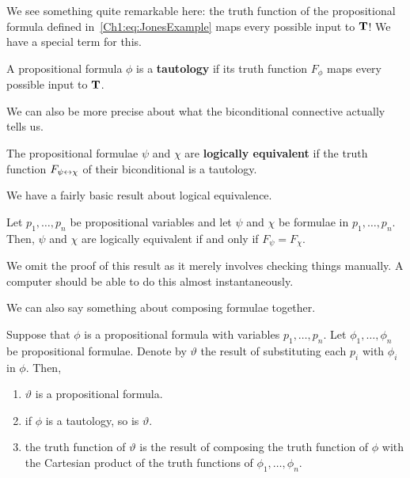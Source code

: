 \begin{boxexample}
    \sorry %
\end{boxexample}

We see something quite remarkable here: the truth function of the propositional formula defined in~\eqref{Ch1:eq:JonesExample} maps every possible input to $\mathbf{T}$! We have a special term for this.

\begin{boxdefinition}[Tautology]\label{Ch1:Def:Tautology}
    A propositional formula $\phi$ is a \textbf{tautology} if its truth function $F_{\phi}$ maps every possible input to $\mathbf{T}$.
\end{boxdefinition}

We can also be more precise about what the biconditional connective actually tells us.

\begin{boxdefinition}\label{Ch1:Def:LogicalEquivalence}
    The propositional formulae $\psi$ and $\chi$ are \textbf{logically equivalent} if the truth function $F_{\psi \leftrightarrow \chi}$ of their biconditional is a tautology.
\end{boxdefinition}

We have a fairly basic result about logical equivalence.

\begin{boxlemma}
    Let $p_1, \ldots, p_n$ be propositional variables and let $\psi$ and $\chi$ be formulae in $p_1, \ldots, p_n$. Then, $\psi$ and $\chi$ are logically equivalent if and only if $F_{\psi} = F_{\chi}$.
\end{boxlemma}

We omit the proof of this result as it merely involves checking things manually. A computer should be able to do this almost instantaneously.

We can also say something about composing formulae together.

\begin{boxlemma}
    Suppose that $\phi$ is a propositional formula with variables $p_1, \ldots, p_n$. Let $\phi_1, \ldots, \phi_n$ be propositional formulae. Denote by $\vartheta$ the result of substituting each $p_i$ with $\phi_i$ in $\phi$. Then,
    \begin{enumerate}[label = \normalfont (\roman*), noitemsep]
        \item $\vartheta$ is a propositional formula.
        \item if $\phi$ is a tautology, so is $\vartheta$.
        \item the truth function of $\vartheta$ is the result of composing the truth function of $\phi$ with the Cartesian product of the truth functions of $\phi_1, \ldots, \phi_n$.
    \end{enumerate}
\end{boxlemma}

